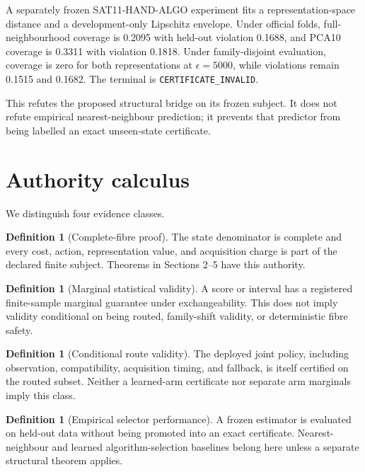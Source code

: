 \documentclass[11pt]{article}
\theoremstyle{definition}
\newtheorem{definition}[theorem]{Definition}
\theoremstyle{remark}
\begin{document}
A separately frozen SAT11-HAND-ALGO experiment fits a representation-space distance and a development-only Lipschitz envelope.  Under official folds, full-neighbourhood coverage is 0.2095 with held-out violation 0.1688, and PCA10 coverage is 0.3311 with violation 0.1818.  Under family-disjoint evaluation, coverage is zero for both representations at $\epsilon=5000$, while violations remain 0.1515 and 0.1682.  The terminal is \texttt{CERTIFICATE\_INVALID}.

This refutes the proposed structural bridge on its frozen subject.  It does not refute empirical nearest-neighbour prediction; it prevents that predictor from being labelled an exact unseen-state certificate.

\section{Authority calculus}

We distinguish four evidence classes.

\begin{definition}[Complete-fibre proof]
The state denominator is complete and every cost, action, representation value, and acquisition charge is part of the declared finite subject.  Theorems in Sections 2--5 have this authority.
\end{definition}

\begin{definition}[Marginal statistical validity]
A score or interval has a registered finite-sample marginal guarantee under exchangeability.  This does not imply validity conditional on being routed, family-shift validity, or deterministic fibre safety.
\end{definition}

\begin{definition}[Conditional route validity]
The deployed joint policy, including observation, compatibility, acquisition timing, and fallback, is itself certified on the routed subset.  Neither a learned-arm certificate nor separate arm marginals imply this class.
\end{definition}

\begin{definition}[Empirical selector performance]
A frozen estimator is evaluated on held-out data without being promoted into an exact certificate.  Nearest-neighbour and learned algorithm-selection baselines belong here unless a separate structural theorem applies.
\end{definition}
\end{document}
